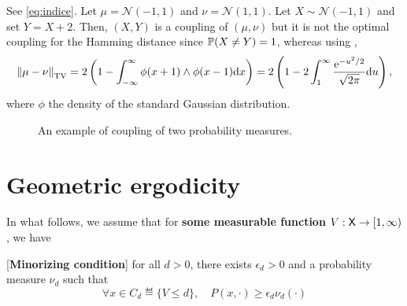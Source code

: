 \documentclass[english,graybox,envcountchap,envcountsame,sectrefs,shortlabels]{svmono}
\theoremstyle{style}
\newenvironment{hyp}[1]{
\begin{enumerate}[label=(\textbf{\sf #1}\arabic*),resume=hyp#1]\begin{sf}}
{\end{sf}\end{enumerate}}
\newcommand{\rme}{\mathrm{e}}
\newcommand{\gauss}{\mathcal{N}}
\newcommand{\eqsp}{}
\begin{document}
\begin{example}
See \autoref{eq:indice}.
  Let $\mu=\gauss(-1,1)$ and $\nu=\gauss(1,1)$. Let $X\sim \gauss(-1,1)$ and set $Y=X+2$. Then,
  $(X,Y)$ is a coupling of $(\mu,\nu)$ but it is not the optimal coupling for the Hamming distance
  since $\mathbb{P}(X\neq Y) = 1$, whereas using ,
  \begin{align*}
    \tvnorm{\mu-\nu} = 2\lr{1 - \int_{-\infty}^\infty \phi(x+1)\wedge\phi(x-1) \rmd x} =2\lr{
1 -     2 \int_1^\infty \frac{\rme^{-u^2/2}}{\sqrt{2\pi}} \rmd u }\eqsp ,
  \end{align*}
  where $\phi$ the density of the standard Gaussian distribution.

\begin{figure}[!h]
\begin{center}
\end{center}

\caption{An example of coupling of two probability measures.}
\label{eq:indice}
\end{figure}

\end{example}
\section{Geometric ergodicity}
In what follows, we assume that for {\bf some measurable function $V:\mathsf{X} \to [1,\infty)$}, we have

\begin{shaded}
\begin{hyp}{A}
\item\label{assum:Aone} [{\bf Minorizing condition}] for all $d>0$, there exists $\epsilon_d>0$ and a probability measure $\nu_d$ such that 
\begin{equation}
\label{eq:minor}
\forall x\in C_d\eqdef\{V\leq d\}, \quad
P(x,\cdot) \geq \epsilon_d \nu_d(\cdot)
\end{equation}
\end{hyp}

\end{shaded}
\end{document}

